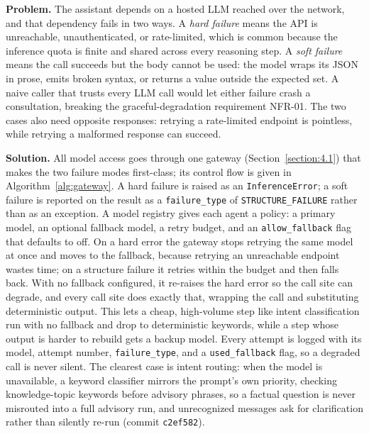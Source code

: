\documentclass[../main.tex]{subfiles}
\begin{document}
\textbf{Problem.}
The assistant depends on a hosted \gls{LLM} reached over the network, and that dependency fails in two ways.
A \textit{hard failure} means the \gls{API} is unreachable, unauthenticated, or rate-limited, which is common because the inference quota is finite and shared across every reasoning step.
A \textit{soft failure} means the call succeeds but the body cannot be used: the model wraps its \gls{JSON} in prose, emits broken syntax, or returns a value outside the expected set.
A naive caller that trusts every \gls{LLM} call would let either failure crash a consultation, breaking the graceful-degradation requirement NFR-01.
The two cases also need opposite responses: retrying a rate-limited endpoint is pointless, while retrying a malformed response can succeed.

\textbf{Solution.}
All model access goes through one gateway (Section~\ref{section:4.1}) that makes the two failure modes first-class; its control flow is given in Algorithm~\ref{alg:gateway}.
A hard failure is raised as an \texttt{InferenceError}; a soft failure is reported on the result as a \texttt{failure\_type} of \texttt{STRUCTURE\_FAILURE} rather than as an exception.
A model registry gives each agent a policy: a primary model, an optional fallback model, a retry budget, and an \texttt{allow\_fallback} flag that defaults to off.
On a hard error the gateway stops retrying the same model at once and moves to the fallback, because retrying an unreachable endpoint wastes time; on a structure failure it retries within the budget and then falls back.
With no fallback configured, it re-raises the hard error so the call site can degrade, and every call site does exactly that, wrapping the call and substituting deterministic output.
This lets a cheap, high-volume step like intent classification run with no fallback and drop to deterministic keywords, while a step whose output is harder to rebuild gets a backup model.
Every attempt is logged with its model, attempt number, \texttt{failure\_type}, and a \texttt{used\_fallback} flag, so a degraded call is never silent.
The clearest case is intent routing: when the model is unavailable, a keyword classifier mirrors the prompt's own priority, checking knowledge-topic keywords before advisory phrases, so a factual question is never misrouted into a full advisory run, and unrecognized messages ask for clarification rather than silently re-run (commit \texttt{c2ef582}).
\end{document}
